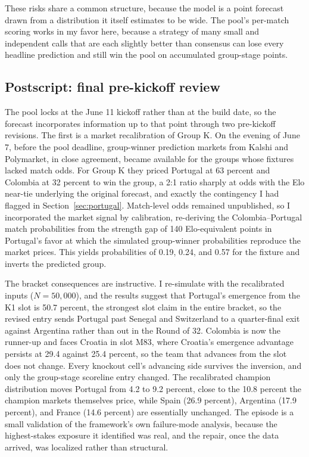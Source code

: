 \documentclass[11pt,a4paper]{article}
\begin{document}
These risks share a common structure, because the model is a point forecast drawn from a distribution it itself estimates to be wide. The pool's per-match scoring works in my favor here, because a strategy of many small and independent calls that are each slightly better than consensus can lose every headline prediction and still win the pool on accumulated group-stage points.

\subsection{Postscript: final pre-kickoff review}\label{sec:postscript}

The pool locks at the June 11 kickoff rather than at the build date, so the forecast incorporates information up to that point through two pre-kickoff revisions. The first is a market recalibration of Group K. On the evening of June 7, before the pool deadline, group-winner prediction markets from Kalshi and Polymarket, in close agreement, became available for the groups whose fixtures lacked match odds. For Group K they priced Portugal at 63 percent and Colombia at 32 percent to win the group, a 2:1 ratio sharply at odds with the Elo near-tie underlying the original forecast, and exactly the contingency I had flagged in Section~\ref{sec:portugal}. Match-level odds remained unpublished, so I incorporated the market signal by calibration, re-deriving the Colombia--Portugal match probabilities from the strength gap of 140 Elo-equivalent points in Portugal's favor at which the simulated group-winner probabilities reproduce the market prices. This yields probabilities of 0.19, 0.24, and 0.57 for the fixture and inverts the predicted group.

The bracket consequences are instructive. I re-simulate with the recalibrated inputs ($N = 50{,}000$), and the results suggest that Portugal's emergence from the K1 slot is 50.7 percent, the strongest slot claim in the entire bracket, so the revised entry sends Portugal past Senegal and Switzerland to a quarter-final exit against Argentina rather than out in the Round of 32. Colombia is now the runner-up and faces Croatia in slot M83, where Croatia's emergence advantage persists at 29.4 against 25.4 percent, so the team that advances from the slot does not change. Every knockout cell's advancing side survives the inversion, and only the group-stage scoreline entry changed. The recalibrated champion distribution moves Portugal from 4.2 to 9.2 percent, close to the 10.8 percent the champion markets themselves price, while Spain (26.9 percent), Argentina (17.9 percent), and France (14.6 percent) are essentially unchanged. The episode is a small validation of the framework's own failure-mode analysis, because the highest-stakes exposure it identified was real, and the repair, once the data arrived, was localized rather than structural.
\end{document}

